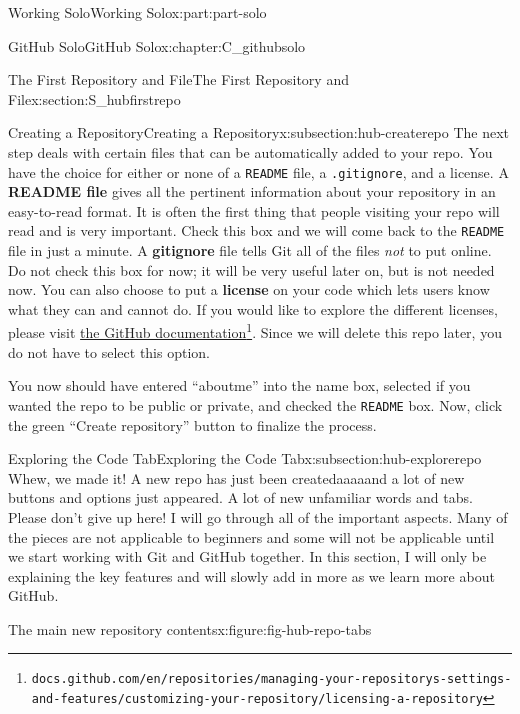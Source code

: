 \documentclass[oneside,10pt,]{book}
\newcommand{\mono}[1]{\texttt{#1}}
\newcommand{\terminology}[1]{\textbf{#1}}
\begin{document}
\begin{partptx}{Working Solo}{}{Working Solo}{}{}{x:part:part-solo}
\begin{chapterptx}{GitHub Solo}{}{GitHub Solo}{}{}{x:chapter:C_githubsolo}
\begin{sectionptx}{The First Repository and File}{}{The First Repository and File}{}{}{x:section:S_hubfirstrepo}
\begin{subsectionptx}{Creating a Repository}{}{Creating a Repository}{}{}{x:subsection:hub-createrepo}
 The next step deals with certain files that can be automatically added to your repo. You have the choice for either or none of a \mono{README} file, a \mono{.gitignore}, and a license. A \terminology{README file} gives all the pertinent information about your repository in an easy-to-read format. It is often the first thing that people visiting your repo will read and is very important. Check this box and we will come back to the \mono{README} file in just a minute. A \terminology{gitignore} file tells Git all of the files \emph{not} to put online. Do not check this box for now; it will be very useful later on, but is not needed now. You can also choose to put a \terminology{license} on your code which lets users know what they can and cannot do. If you would like to explore the different licenses, please visit \href{https://docs.github.com/en/repositories/managing-your-repositorys-settings-and-features/customizing-your-repository/licensing-a-repository}{the GitHub documentation}\footnote{\nolinkurl{docs.github.com/en/repositories/managing-your-repositorys-settings-and-features/customizing-your-repository/licensing-a-repository}\label{g:fn:idp615753752}}. Since we will delete this repo later, you do not have to select this option.%
\par
You now should have entered ``aboutme'' into the name box, selected if you wanted the repo to be public or private, and checked the \mono{README} box. Now, click the green ``Create repository'' button to finalize the process.%
\end{subsectionptx}
%
%
\typeout{************************************************}
\typeout{************************************************}
%
\begin{subsectionptx}{Exploring the Code Tab}{}{Exploring the Code Tab}{}{}{x:subsection:hub-explorerepo}
%
Whew, we made it! A new repo has just been created\textellipsis{}aaaaand a lot of new buttons and options just appeared. A lot of new unfamiliar words and tabs. Please don't give up here! I will go through all of the important aspects. Many of the pieces are not applicable to beginners and some will not be applicable until we start working with Git and GitHub together. In this section, I will only be explaining the key features and will slowly add in more as we learn more about GitHub.%
\begin{figureptx}{The main new repository contents}{x:figure:fig-hub-repo-tabs}{}%
\begin{image}{0.1}{0.8}{0.1}%

\end{image}
\end{figureptx}
\end{subsectionptx}
\end{sectionptx}
\end{chapterptx}
\end{partptx}
\end{document}
